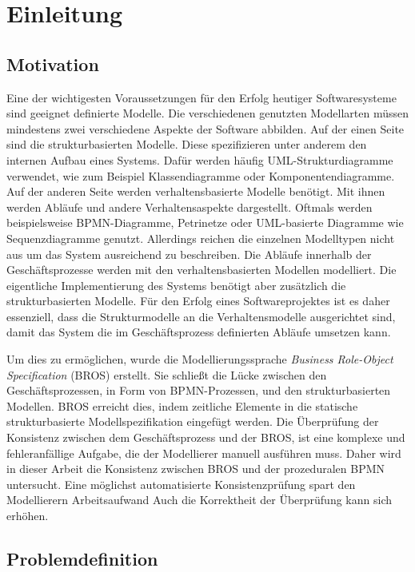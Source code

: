 \chapter{Einleitung}
\label{chap:introduction}

\section{Motivation}

Eine der wichtigesten Voraussetzungen für den Erfolg heutiger Softwaresysteme sind geeignet definierte Modelle.
Die verschiedenen genutzten Modellarten müssen mindestens zwei verschiedene Aspekte der Software abbilden.
Auf der einen Seite sind die strukturbasierten Modelle.
Diese spezifizieren unter anderem den internen Aufbau eines Systems.
Dafür werden häufig UML-Strukturdiagramme verwendet, wie zum Beispiel Klassendiagramme oder Komponentendiagramme.
Auf der anderen Seite werden verhaltensbasierte Modelle benötigt.
Mit ihnen werden Abläufe und andere Verhaltensaspekte dargestellt.
Oftmals werden beispielsweise BPMN-Diagramme, Petrinetze oder UML-basierte Diagramme wie Sequenzdiagramme genutzt.
Allerdings reichen die einzelnen Modelltypen nicht aus um das System ausreichend zu beschreiben.
Die Abläufe innerhalb der Geschäftsprozesse werden mit den verhaltensbasierten Modellen modelliert.
Die eigentliche Implementierung des Systems benötigt aber zusätzlich die strukturbasierten Modelle.
Für den Erfolg eines Softwareprojektes ist es daher essenziell, dass die Strukturmodelle an die Verhaltensmodelle ausgerichtet sind, damit das System die im Geschäftsprozess definierten Abläufe umsetzen kann.

Um dies zu ermöglichen, wurde die Modellierungssprache \emph{Business Role-Object Specification} (BROS) erstellt.
Sie schließt die Lücke zwischen den Geschäftsprozessen, in Form von BPMN-Prozessen, und den  strukturbasierten Modellen.
BROS erreicht dies, indem zeitliche Elemente in die statische strukturbasierte Modellspezifikation eingefügt werden.
Die Überprüfung der Konsistenz zwischen dem Geschäftsprozess und der BROS, ist eine komplexe und fehleranfällige Aufgabe, die der Modellierer manuell ausführen muss.
Daher wird in dieser Arbeit die Konsistenz zwischen BROS und der prozeduralen BPMN untersucht.
Eine möglichst automatisierte Konsistenzprüfung spart den Modellierern Arbeitsaufwand
Auch die Korrektheit der Überprüfung kann sich erhöhen.

\section{Problemdefinition}

